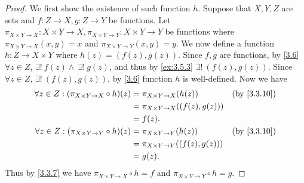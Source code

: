 \begin{proof}
  We first show the existence of such function \(h\).
  Suppose that \(X, Y, Z\) are sets and \(f : Z \to X, g : Z \to Y\) be functions.
  Let \(\pi_{X \times Y \to X} : X \times Y \to X, \pi_{X \times Y \to Y} : X \times Y \to Y\) be functions where \(\pi_{X \times Y \to X}(x, y) = x\) and \(\pi_{X \times Y \to Y}(x, y) = y\).
  We now define a function \(h : Z \to X \times Y\) where \(h(z) = (f(z), g(z))\).
  Since \(f, g\) are functions, by \cref{3.6} \(\forall z \in Z\), \(\exists!\ f(z) \land \ \exists!\ g(z)\), and thus by \cref{ex:3.5.3} \(\exists!\ (f(z), g(z))\).
  Since \(\forall z \in Z\), \(\exists!\ (f(z), g(z))\), by \cref{3.6} function \(h\) is well-defined.
  Now we have
  \begin{align*}
    \forall z \in Z : (\pi_{X \times Y \to X} \circ h)(z) & = \pi_{X \times Y \to X}(h(z))         &  & \text{(by \cref{3.3.10})} \\
                                                          & = \pi_{X \times Y \to X}((f(z), g(z)))                                \\
                                                          & = f(z).                                                               \\
    \forall z \in Z : (\pi_{X \times Y \to Y} \circ h)(z) & = \pi_{X \times Y \to Y}(h(z))         &  & \text{(by \cref{3.3.10})} \\
                                                          & = \pi_{X \times Y \to Y}((f(z), g(z)))                                \\
                                                          & = g(z).
  \end{align*}
  Thus by \cref{3.3.7} we have \(\pi_{X \times Y \to X} \circ h = f\) and \(\pi_{X \times Y \to Y} \circ h = g\).


\end{proof}
